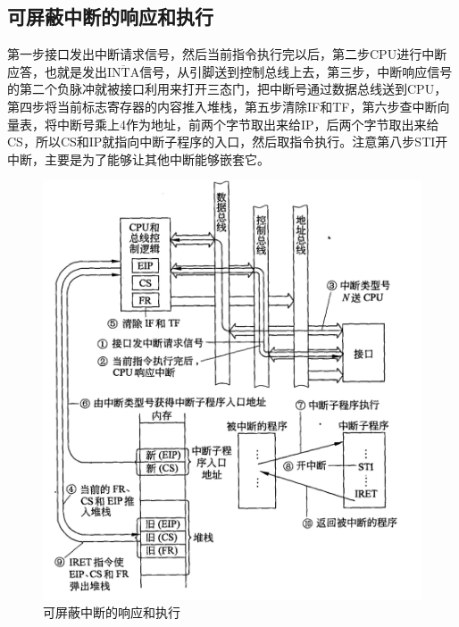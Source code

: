 \documentclass[UTF8]{ctexart}
\begin{document}
\subsection{可屏蔽中断的响应和执行}
第一步接口发出中断请求信号，然后当前指令执行完以后，第二步CPU进行中断应答，也就是发出$\overline{\mathrm{INTA}}$信号，从引脚送到控制总线上去，第三步，中断响应信号的第二个负脉冲就被接口利用来打开三态门，把中断号通过数据总线送到CPU，第四步将当前标志寄存器的内容推入堆栈，第五步清除IF和TF，第六步查中断向量表，将中断号乘上4作为地址，前两个字节取出来给IP，后两个字节取出来给CS，所以CS和IP就指向中断子程序的入口，然后取指令执行。注意第八步STI开中断，主要是为了能够让其他中断能够嵌套它。
\begin{figure}[h]
	\centering
	\includegraphics[scale=0.5]{2.PNG}
    \caption{可屏蔽中断的响应和执行}
\end{figure}
\end{document}
